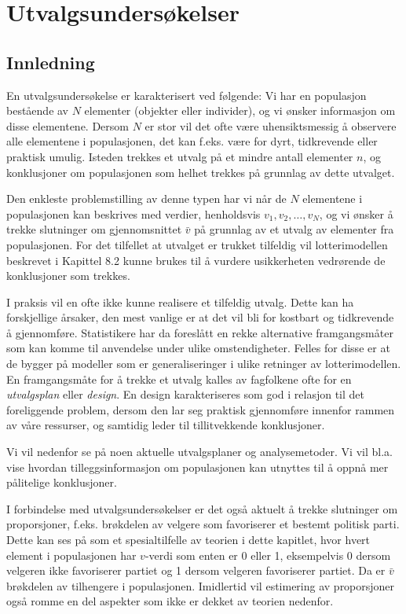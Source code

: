 \chapter{Utvalgsundersøkelser}
\label{kap:utvalgsundersokelser} %

\section{Innledning}

En utvalgsundersøkelse er karakterisert ved følgende:  Vi har en 
populasjon bestående av $N$ elementer (objekter eller individer), og vi
ønsker informasjon om disse elementene.  Dersom $N$ er stor vil det ofte 
være uhensikts\-messig å observere alle elementene i populasjonen,
det kan f.eks. være for dyrt, tidkrevende eller praktisk umulig.  Isteden
trekkes et utvalg på et mindre antall elementer $n$, og konklusjoner
om populasjonen som helhet trekkes på grunnlag av dette utvalget.

Den enkleste problemstilling av denne typen har vi når de $N$ elementene
i populasjonen kan beskrives med verdier, henholdsvis $v_1, v_2, \ldots,
v_N$, og vi ønsker å trekke slutninger om gjennomsnittet $\bar{v}$
på grunnlag av et utvalg av elementer fra populasjonen.  For det tilfellet
at utvalget er trukket tilfeldig vil lotterimodellen beskrevet i Kapittel 8.2
kunne brukes til å vurdere usikkerheten vedrørende de konklusjoner som
trekkes.

I praksis vil en ofte ikke kunne realisere et tilfeldig utvalg.  Dette kan ha
forskjellige årsaker, den mest vanlige er at det vil bli for kostbart og
tidkrevende å gjennomføre.  Statistikere har da foreslått en rekke
alternative framgangsmåter som kan komme til anvendelse under ulike 
omstendigheter.  Felles for disse er at de bygger på modeller som er
generaliseringer i ulike retninger av lotterimodellen.  En framgangsmåte
for å trekke et utvalg kalles av fagfolkene ofte for en {\em utvalgsplan}
eller {\em design}.  En design karakteriseres som god i relasjon til det 
foreliggende problem, dersom den lar seg praktisk gjennomføre innenfor
rammen av våre ressurser, og samtidig leder til tillitvekkende
konklusjoner.

Vi vil nedenfor se på noen aktuelle utvalgsplaner og analysemetoder.  Vi
vil bl.a. vise hvordan tilleggsinformasjon om populasjonen kan utnyttes til
å oppnå mer pålitelige konklusjoner.

I forbindelse med utvalgsundersøkelser er det også aktuelt å 
trekke slutninger om proporsjoner, f.eks. brøkdelen av velgere som 
favoriserer et bestemt politisk parti.  Dette kan ses på som et
spesialtilfelle av teorien i dette kapitlet, hvor hvert element i 
populasjonen  har $v$-verdi som enten er 0 eller 1, eksempelvis 0 dersom 
velgeren ikke favoriserer partiet og 1 dersom velgeren favoriserer partiet.
Da er $\bar{v}$ brøkdelen av tilhengere i populasjonen.  Imidlertid vil
estimering av proporsjoner også romme en del aspekter som ikke er dekket
av teorien nedenfor.


